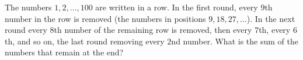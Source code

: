 The numbers $1,2,\dots,100$ are written in a row. In the first round, every $9$th number in the row is removed (the numbers in positions $9,18,27,\dots$). In the next round every $8$th number of the remaining row is removed, then every $7$th, every $6$th, and so on, the last round removing every $2$nd number. What is the sum of the numbers that remain at the end?
